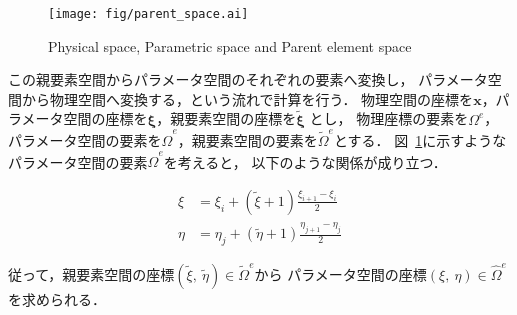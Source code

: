 \begin{figure}[htbp]
  \centering
  \texttt{[image: fig/parent\_space.ai]}
  \caption{Physical space, Parametric space and Parent element space}
  \label{fig:parent space}
\end{figure}

\noindent
この親要素空間からパラメータ空間のそれぞれの要素へ変換し，
パラメータ空間から物理空間へ変換する，という流れで計算を行う．
物理空間の座標を$\boldsymbol{x}$，パラメータ空間の座標を$\boldsymbol{\xi}$，親要素空間の座標を$\tilde{\boldsymbol{\xi}}$
とし，
物理座標の要素を$\Omega^e$，パラメータ空間の要素を$\hat{\Omega}^e$，親要素空間の要素を$\tilde{\Omega}^e$とする．
図~\ref{fig:parent space}に示すようなパラメータ空間の要素$\hat{\Omega}^e$を考えると，
以下のような関係が成り立つ．

\begin{align}
  \label{eq:parent01}
  \xi &= \xi_i + (\tilde{\xi} + 1) \frac{\xi_{i+1} - \xi_i}{2}\\
  \label{eq:parent02}
  \eta &= \eta_j + (\tilde{\eta} + 1) \frac{\eta_{j+1} - \eta_j}{2}
\end{align}

\noindent
従って，親要素空間の座標$(\tilde{\xi},\ \tilde{\eta})\in \tilde{\Omega}^e$から
パラメータ空間の座標$(\xi,\ \eta)\in \hat{\Omega}^e$を求められる．